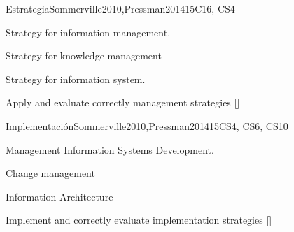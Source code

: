\begin{syllabus}
\begin{unit}{Estrategia}{}{Sommerville2010,Pressman2014}{15}{C16, CS4}
\begin{topics}
    \item Strategy for information management.
    \item Strategy for knowledge management
    \item Strategy for information system.
\end{topics}
\begin{learningoutcomes}
    \item Apply and evaluate correctly management strategies [\Assessment]
\end{learningoutcomes}
\end{unit}

\begin{unit}{Implementación}{}{Sommerville2010,Pressman2014}{15}{CS4, CS6, CS10}
\begin{topics}
    \item Management Information Systems Development.
    \item Change management
    \item Information Architecture
\end{topics}
\begin{learningoutcomes}
    \item Implement and correctly evaluate implementation strategies [\Assessment]
\end{learningoutcomes}
\end{unit}



\begin{coursebibliography}
\end{coursebibliography}

\end{syllabus}
